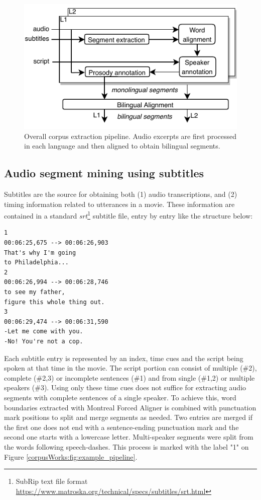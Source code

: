 \begin{figure}[t]
  \centering
  \includegraphics[width=0.6\linewidth]{img/movie2parallelDB/movie2parallelDB-pipeline.pdf}
  \caption{Overall corpus extraction pipeline. Audio excerpts are first processed in each language and then aligned to obtain bilingual segments.}
  \label{corpusWorks:fig:overall-scheme}
\end{figure}

\subsection*{Audio segment mining using subtitles}
Subtitles are the source for obtaining both (1) audio transcriptions, and (2) timing information related to utterances in a movie. These information are contained in a standard \textit{srt}\footnote{SubRip text file format \url{https://www.matroska.org/technical/specs/subtitles/srt.html}} subtitle file, entry by entry like the structure below:

\begin{lstlisting}
1
00:06:25,675 --> 00:06:26,903
That's why I'm going
to Philadelphia...
2
00:06:26,994 --> 00:06:28,746
to see my father,
figure this whole thing out.
3
00:06:29,474 --> 00:06:31,590
-Let me come with you.
-No! You're not a cop.
\end{lstlisting}

Each subtitle entry is represented by an index, time cues and the script being spoken at that time in the movie. The script portion can consist of multiple (\#2), complete (\#2,3) or incomplete sentences (\#1) and from single (\#1,2) or multiple speakers (\#3). Using only these time cues does not suffice for extracting audio segments with complete sentences of a single speaker. To achieve this, word boundaries extracted with Montreal Forced Aligner is combined with punctuation mark positions to split and merge segments as needed. Two entries are merged if the first one does not end with a sentence-ending punctuation mark and the second one starts with a lowercase letter. Multi-speaker segments were split from the words following speech-dashes. This process is marked with the label "1" on Figure \ref{corpusWorks:fig:example_pipeline}.



